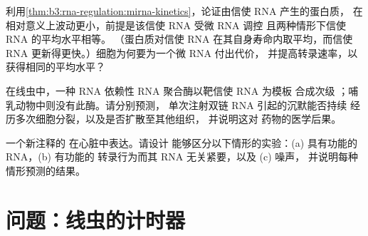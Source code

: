 \begin{exercise}[$\star\star\star$]\label{exo:b3:rna-regulation:10}
利用\cref{thm:b3:rna-regulation:mirna-kinetics}，论证由信使 RNA 产生的蛋白质，
在相对意义上波动更小，前提是该信使 RNA 受微 RNA 调控
且两种情形下信使 RNA 的平均水平相等。
（蛋白质对信使 RNA 在其自身寿命内取平均，而信使 RNA
更新得更快。）细胞为何要为一个微 RNA 付出代价，
并提高转录速率，以获得相同的平均水平？
\end{exercise}

\begin{exercise}[$\star\star\star$]\label{exo:b3:rna-regulation:11}
在线虫中，一种 RNA 依赖性 RNA 聚合酶以靶信使 RNA 为模板
合成次级 ；哺乳动物中则没有此酶。请分别预测，
单次注射双链 RNA 引起的沉默能否持续
经历多次细胞分裂，以及是否扩散至其他组织，
并说明这对  药物的医学后果。
\end{exercise}

\begin{exercise}[$\star\star\star$]\label{exo:b3:rna-regulation:12}
一个新注释的  在心脏中表达。请设计
能够区分以下情形的实验：(a) 具有功能的 RNA，(b) 有功能的
转录行为而其 RNA 无关紧要，以及 (c) 噪声，
并说明每种情形预测的结果。
\end{exercise}

\section{问题：线虫的计时器}

